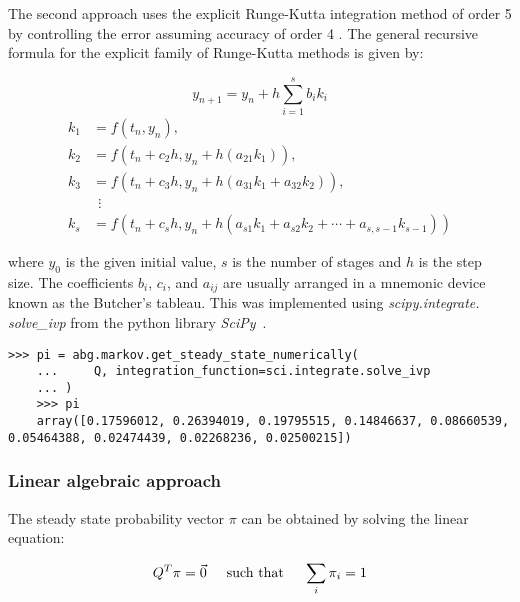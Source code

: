 The second approach uses the explicit Runge-Kutta integration method of order 5
by controlling the error assuming accuracy of order 4
\cite{solve_ivp_rk45_method, runge_kutta_formulas}.
The general recursive formula for the explicit family of Runge-Kutta methods is
given by:

\begin{equation}
    y_{n+1} = y_n + h \sum_{i=1}^s b_i k_i
\end{equation}
\begin{align}
    k_1 & = f(t_n, y_n), \nonumber \\
    k_2 & = f(t_n+c_2h, y_n+h(a_{21}k_1)), \nonumber \\
    k_3 & = f(t_n+c_3h, y_n+h(a_{31}k_1+a_{32}k_2)), \nonumber \\
        & \ \ \vdots \nonumber \\
    k_s & = f(t_n+c_s h, y_n+h(a_{s1}k_1+a_{s2}k_2+\cdots+a_{s,s-1}k_{s-1}))
    \nonumber
\end{align}

where \(y_0\) is the given initial value, \(s\) is the number of stages and
\(h\) is the step size.
The coefficients \(b_i\), \(c_i\), and \(a_{ij}\) are usually arranged in a
mnemonic device known as the Butcher's tableau.
This was implemented using \textit{scipy.integrate. solve\_ivp} from the python
library \textit{SciPy}~\cite{2020SciPy-NMeth}.

\begin{lstlisting}[style=pystyle]
    >>> pi = abg.markov.get_steady_state_numerically(
    ...     Q, integration_function=sci.integrate.solve_ivp
    ... )
    >>> pi
    array([0.17596012, 0.26394019, 0.19795515, 0.14846637, 0.08660539, 0.05464388, 0.02474439, 0.02268236, 0.02500215])

\end{lstlisting}


\subsubsection{Linear algebraic approach}

The steady state probability vector \( \pi \) can be obtained by solving the
linear equation:

\begin{equation}\label{eq:numpy_linalg_solve_1}
    Q^T \pi = \vec{0} \hspace{0.5cm} \text{such that} \hspace{0.5cm}
    \sum_{i} \pi_i = 1
\end{equation}

